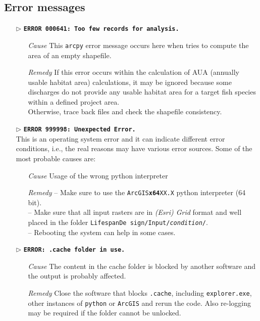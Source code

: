 \subsection{Error messages}\label{sec:errors}
\begin{itemize}
	
	\item[$\triangleright$] \textbf{\texttt{ERROR 000641: Too few records for analysis.}}\\		
	\begin{itemize}
		\item[\textit{Cause}\hspace{0.27cm}] This \texttt{arcpy} error message occurs here when  tries to compute the area of an empty shapefile.
		\item[\textit{Remedy}] If this error occurs within the calculation of AUA (annually usable habitat area) calculations, it may be ignored because some discharges do not provide any usable habitat area for a target fish species within a defined project area.\\
		Otherwise, trace back files and check the shapefile consistency.\\
	\end{itemize}
	
	\item[$\triangleright$] \textbf{\texttt{ERROR 999998: Unexpected Error.}}\\
This is an operating system error and it can indicate different error conditions, i.e., the real reasons may have various error sources. Some of the most probable causes are:
	\begin{itemize}
		\item[\textit{Cause}\hspace{0.27cm}] Usage of the wrong python interpreter
		\item[\textit{Remedy}] -- Make sure to use the \texttt{ArcGIS\textbf{x64}XX.X} python interpreter (64 bit).\\
							   -- Make sure that all input rasters are in \textit{(Esri) Grid} format and well placed in the folder \texttt{LifespanDe sign/Input/\textit{condition}/}.\\
							   -- Rebooting the system can help in some cases.\\
	\end{itemize}
	
	\item[$\triangleright$] \textbf{\texttt{ERROR: .cache folder in use.}}
	\begin{itemize}
		\item[\textit{Cause}\hspace{0.27cm}] The content in the cache folder is blocked by another software and the output is probably affected.
		\item[\textit{Remedy}] Close the software that blocks \texttt{.cache}, including \texttt{explorer.exe}, other instances of \texttt{python} or \texttt{ArcGIS} and rerun the code. Also re-logging may be required if the folder cannot be unlocked.\\
	\end{itemize}
	

\end{itemize}
